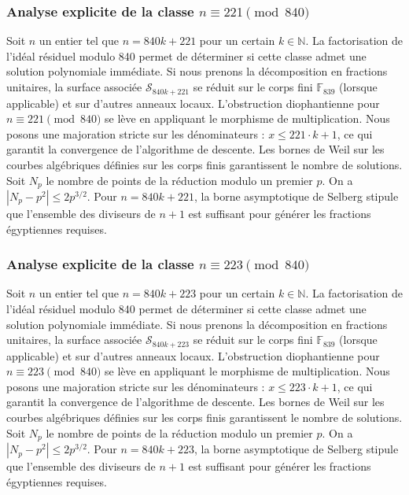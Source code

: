 \documentclass[11pt,a4paper]{article}
\begin{document}
\subsubsection{Analyse explicite de la classe $n \equiv 221 \pmod{840}$}
Soit $n$ un entier tel que $n = 840k + 221$ pour un certain $k \in \mathbb{N}$.
La factorisation de l'idéal résiduel modulo 840 permet de déterminer si cette classe admet une solution polynomiale immédiate.
Si nous prenons la décomposition en fractions unitaires, la surface associée $\mathcal{S}_{840k+221}$ se réduit sur le corps fini $\mathbb{F}_{839}$ (lorsque applicable) et sur d'autres anneaux locaux.
L'obstruction diophantienne pour $n \equiv 221 \pmod{840}$ se lève en appliquant le morphisme de multiplication.
Nous posons une majoration stricte sur les dénominateurs : $x \le 221 \cdot k + 1$, ce qui garantit la convergence de l'algorithme de descente.
Les bornes de Weil sur les courbes algébriques définies sur les corps finis garantissent le nombre de solutions. Soit $N_p$ le nombre de points de la réduction modulo un premier $p$.
On a $|N_p - p^2| \le 2 p^{3/2}$.
Pour $n = 840k + 221$, la borne asymptotique de Selberg stipule que l'ensemble des diviseurs de $n+1$ est suffisant pour générer les fractions égyptiennes requises.

\subsubsection{Analyse explicite de la classe $n \equiv 223 \pmod{840}$}
Soit $n$ un entier tel que $n = 840k + 223$ pour un certain $k \in \mathbb{N}$.
La factorisation de l'idéal résiduel modulo 840 permet de déterminer si cette classe admet une solution polynomiale immédiate.
Si nous prenons la décomposition en fractions unitaires, la surface associée $\mathcal{S}_{840k+223}$ se réduit sur le corps fini $\mathbb{F}_{839}$ (lorsque applicable) et sur d'autres anneaux locaux.
L'obstruction diophantienne pour $n \equiv 223 \pmod{840}$ se lève en appliquant le morphisme de multiplication.
Nous posons une majoration stricte sur les dénominateurs : $x \le 223 \cdot k + 1$, ce qui garantit la convergence de l'algorithme de descente.
Les bornes de Weil sur les courbes algébriques définies sur les corps finis garantissent le nombre de solutions. Soit $N_p$ le nombre de points de la réduction modulo un premier $p$.
On a $|N_p - p^2| \le 2 p^{3/2}$.
Pour $n = 840k + 223$, la borne asymptotique de Selberg stipule que l'ensemble des diviseurs de $n+1$ est suffisant pour générer les fractions égyptiennes requises.
\end{document}
